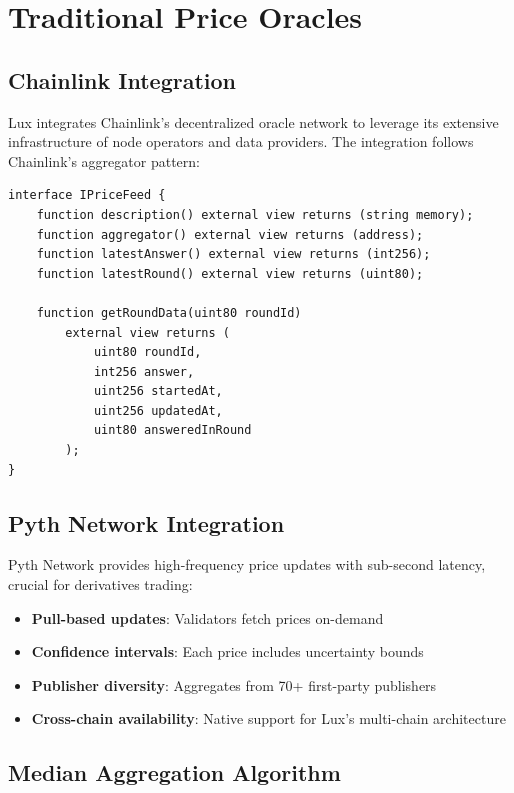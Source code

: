 \section{Traditional Price Oracles}


\subsection{Chainlink Integration}

Lux integrates Chainlink's decentralized oracle network to leverage its extensive infrastructure of node operators and data providers. The integration follows Chainlink's aggregator pattern:

\begin{lstlisting}[caption={Chainlink Price Feed Interface}]
interface IPriceFeed {
    function description() external view returns (string memory);
    function aggregator() external view returns (address);
    function latestAnswer() external view returns (int256);
    function latestRound() external view returns (uint80);
    
    function getRoundData(uint80 roundId) 
        external view returns (
            uint80 roundId,
            int256 answer,
            uint256 startedAt,
            uint256 updatedAt,
            uint80 answeredInRound
        );
}
\end{lstlisting}

\subsection{Pyth Network Integration}

Pyth Network provides high-frequency price updates with sub-second latency, crucial for derivatives trading:

\begin{itemize}
    \item \textbf{Pull-based updates}: Validators fetch prices on-demand
    \item \textbf{Confidence intervals}: Each price includes uncertainty bounds
    \item \textbf{Publisher diversity}: Aggregates from 70+ first-party publishers
    \item \textbf{Cross-chain availability}: Native support for Lux's multi-chain architecture
\end{itemize}

\subsection{Median Aggregation Algorithm}

